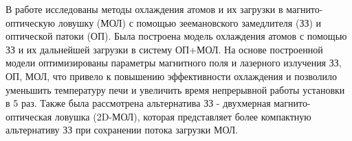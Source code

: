 

В работе исследованы методы охлаждения атомов и их загрузки в магнито-оптическую ловушку (МОЛ) с помощью зеемановского замедлителя (ЗЗ) и оптической патоки (ОП). Была построена модель охлаждения атомов с помощью ЗЗ и их дальнейшей загрузки в систему ОП+МОЛ. На основе построенной модели оптимизированы параметры магнитного поля и лазерного излучения ЗЗ, ОП, МОЛ, что привело к повышению эффективности охлаждения и позволило уменьшить температуру печи и увеличить время непрерывной работы установки в 5 раз. Также была рассмотрена альтернатива ЗЗ - двухмерная магнито-оптическая ловушка (2D-МОЛ), которая представляет более компактную альтернативу ЗЗ при сохранении потока загрузки МОЛ. 